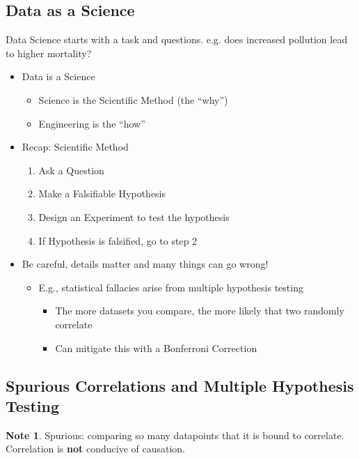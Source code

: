 \documentclass[11pt]{article}
\theoremstyle{definition}
\newtheorem{note}{Note}
\begin{document}
\subsection{Data as a Science}
Data Science starts with a task and questions.
e.g. does increased pollution lead to higher mortality?
\begin{itemize}
  \item Data is a Science
  \begin{itemize}
    \item Science is the Scientific Method (the “why”)
    \item Engineering is the “how”
  \end{itemize}
  \item Recap: Scientific Method
  \begin{enumerate}
    \item Ask a Question
    \item Make a Falsifiable Hypothesis
    \item Design an Experiment to test the hypothesis
    \item If Hypothesis is falsified, go to step 2
  \end{enumerate}
  \item Be careful, details matter and many things can go wrong!
  \begin{itemize}
    \item E.g., statistical fallacies arise from multiple hypothesis testing
    \begin{itemize}
      \item The more datasets you compare, the more likely that two randomly correlate
      \item Can mitigate this with a Bonferroni Correction
    \end{itemize}
  \end{itemize}
\end{itemize}

\subsection{Spurious Correlations and Multiple Hypothesis Testing}
\begin{note}
  Spurious: comparing so many datapoints that it is bound to correlate. 
  Correlation is \textbf{not} conducive of causation.
\end{note}
\end{document}
